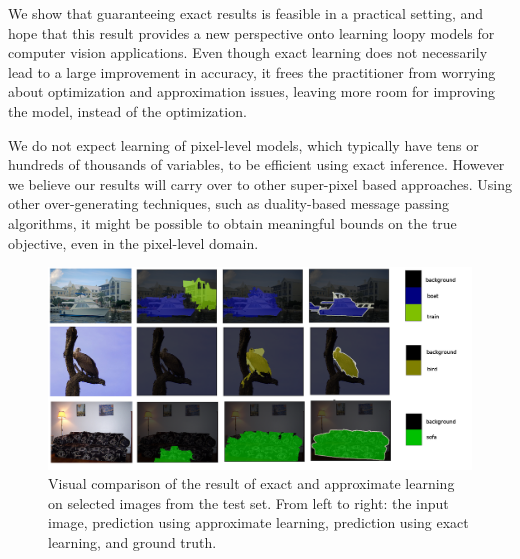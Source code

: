 We show that guaranteeing exact results is feasible in a practical setting, and
hope that this result provides a new perspective onto learning loopy models for
computer vision applications.
%
Even though exact learning does not necessarily lead to a large improvement in
accuracy, it frees the practitioner from worrying about optimization and
approximation issues, leaving more room for improving the model, instead of the
optimization.

We do not expect learning of pixel-level models, which typically have tens or
hundreds of thousands of variables, to be efficient using exact inference. However we
believe our results will carry over to other super-pixel based approaches.
Using other over-generating techniques, such as duality-based message passing
algorithms, it might be possible to obtain meaningful bounds on the true
objective, even in the pixel-level domain.

\begin{figure}
\centering
\includegraphics[width=\linewidth]{figure}
\caption{%
    Visual comparison of the result of exact and approximate learning on
    selected images from the test set.  From left to right: the input image,
    prediction using approximate learning, prediction using exact learning, and
    ground truth.
}
\end{figure}

